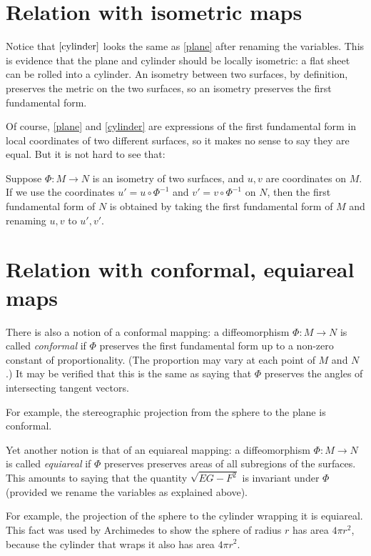 \documentclass[12pt]{article}
\providecommand{\defnterm}[1]{\emph{#1}}
\begin{document}
\section*{Relation with isometric maps}
Notice that $\eqref{cylinder}$ looks the same as \eqref{plane} after renaming the variables.
This is evidence that the plane and cylinder should be locally isometric:
a flat sheet can be rolled into a cylinder.
An isometry between two surfaces, by definition, preserves the metric on the
two surfaces, so an isometry preserves the first fundamental form.

Of course, \eqref{plane} and \eqref{cylinder} are expressions
of the first fundamental form in local coordinates of two different surfaces, 
so it makes no sense to say they are equal. But it is not hard to see that:

Suppose $\Phi\colon M \to N$ is an isometry of two surfaces,
and $u, v$ are coordinates on $M$.
If we use the coordinates $u' = u \circ \Phi^{-1}$ 
and $v' = v \circ \Phi^{-1}$
on $N$, then
the first fundamental form of $N$ is obtained
by taking the first fundamental form of $M$ and renaming $u, v$ to $u', v'$.

\section*{Relation with conformal, equiareal maps}

There is also a notion of a conformal mapping:
a diffeomorphism $\Phi \colon M \to N$ is called \defnterm{conformal}
if $\Phi$ preserves the first fundamental form up to a non-zero constant
of proportionality.  (The proportion may vary at each point of $M$ and $N$.)
It may be verified that this is the same as saying that $\Phi$ preserves the
angles of intersecting tangent vectors.

For example, the stereographic projection from the sphere to the plane
is conformal.

Yet another notion is that of an equiareal mapping:
a diffeomorphism $\Phi \colon M \to N$ is called \defnterm{equiareal}
if $\Phi$ preserves preserves areas of all subregions of the surfaces.
This amounts to saying that the quantity
$\sqrt{EG - F^2}$ is invariant under $\Phi$
(provided we rename the variables as explained above).

For example, the projection of the sphere to the cylinder wrapping it
is equiareal.  This fact was used by Archimedes to show the sphere of radius $r$
has area $4\pi r^2$, because the cylinder that wraps it
also has area $4\pi r^2$. 
\end{document}

